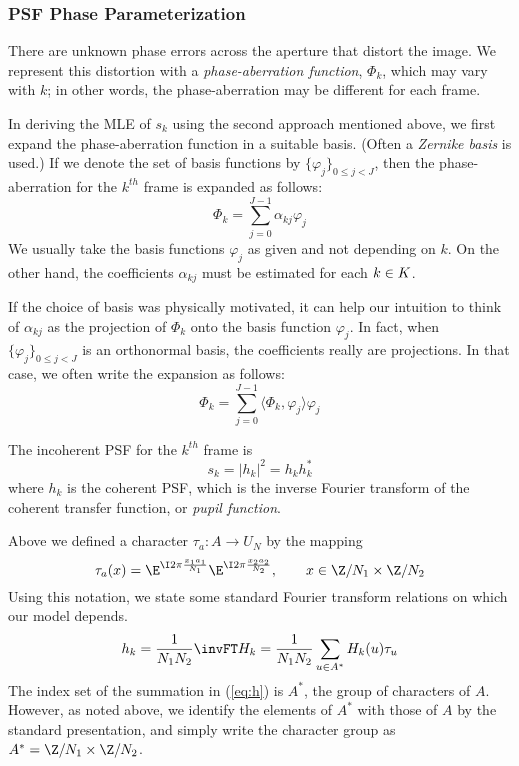 \subsubsection{PSF Phase Parameterization}
There are unknown phase errors across the aperture that distort the image.
We represent this distortion with a \emph{phase-aberration function},
$\Phi_k$, which may vary with $k$; in other words, the phase-aberration may be
different for each frame. 

In deriving the MLE of $s_k$ using the second approach mentioned
above, we first expand the phase-aberration function in a suitable basis.
(Often a \emph{Zernike basis} is used.)  
If we denote the set of basis functions by $\{\varphi_j\}_{0\leq j < J}$, then the
phase-aberration for the $k^{th}$ frame is expanded as follows:
\[
\Phi_k = \sum_{j=0}^{J-1} \alpha_{kj} \varphi_j
\]
We usually take the basis functions $\varphi_j$ as given and not depending on
$k$.  On the other hand, the coefficients $\alpha_{kj}$ must be
estimated for each $k \in K$.

\begin{remark} If the choice of basis was physically motivated,
it can help our intuition to think of $\alpha_{kj}$ as the 
projection of $\Phi_k$ onto the basis function $\varphi_j$. In fact, when
$\{\varphi_j\}_{0\leq j < J}$ is an orthonormal basis, the coefficients really are
projections.  In that case, we often write the expansion as follows:
\[ 
\Phi_k = \sum_{j=0}^{J-1} \langle \Phi_k, \varphi_j\rangle \varphi_j 
\]
\end{remark}

The incoherent PSF for the $k^{th}$ frame is
\begin{equation}\label{eq:s}
s_k = |h_k|^2 = h_k h_k^* %
\end{equation}  
where $h_k$ is the coherent PSF, which is the inverse Fourier transform of the
coherent transfer function, or \emph{pupil function}.  

Above we defined a character $\tau_a: A \to U_N$ by the mapping
\[
\tau_a(x) = \E^{\I 2\pi \frac{x_1a_1}{N_1}}\E^{\I 2\pi \frac{x_2a_2}{N_2}}, \qquad
x \in \Z/N_1 \times \Z/N_2
\]
Using this notation, we state some standard Fourier transform relations on
which our model depends.
\begin{equation}\label{eq:h}
h_k = \frac{1}{N_1N_2} \invFT H_k = \frac{1}{N_1N_2} \sum_{u\in \groupA^*} H_k(u)\tau_u
\end{equation}  
The index set of the summation in (\ref{eq:h}) is $A^*$, the group of
characters of $A$. However, as noted above, we identify the
elements of $A^*$ with those of $A$ by the standard presentation, and simply
write the character group as $\groupA^* = \Z/N_1 \times \Z/N_2$.    

